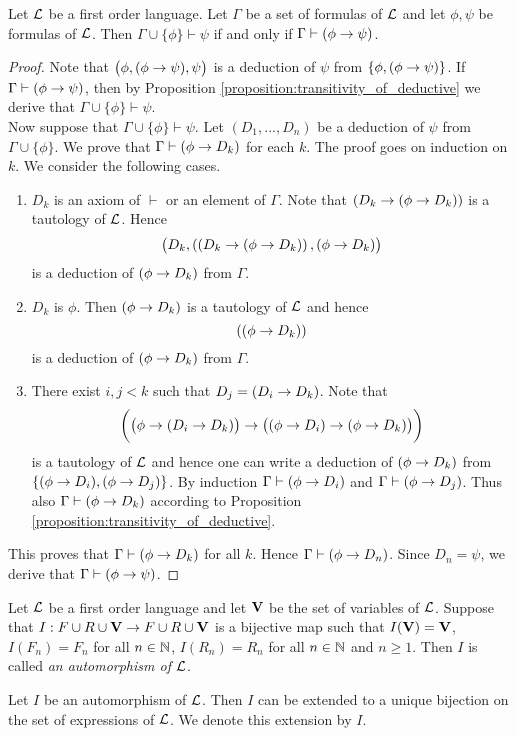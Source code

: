 \begin{theorem}\label{theorem:deduction_theorem}
Let ${\mathcal L}$ be a first order language. Let $\Gamma$ be a set of formulas of ${\mathcal L}$ and let $\phi, \psi$ be formulas of ${\mathcal L}$. Then $\Gamma \cup \{\phi\} \vdash \psi$ if and only if $\Gamma \vdash (\phi \rightarrow \psi)$.
\end{theorem}
\begin{proof}
Note that $\big(\phi, (\phi \rightarrow \psi) , \psi\big)$ is a deduction of $\psi$ from $\{\phi, (\phi \rightarrow \psi)\}$. If $\Gamma \vdash (\phi \rightarrow \psi)$, then by Proposition \ref{proposition:transitivity_of_deductive} we derive that $\Gamma \cup \{\phi\} \vdash \psi$.\\
Now suppose that $\Gamma \cup \{\phi\} \vdash \psi$. Let $(D_1 , ..., D_n)$ be a deduction of $\psi$ from $\Gamma \cup \{\phi\}$. We prove that $\Gamma \vdash (\phi \rightarrow D_k)$ for each $k$. The proof goes on induction on $k$. We consider the following cases.
\begin{enumerate}[label=\textbf{(\arabic*)}, leftmargin=3.0em]
\item $D_k$ is an axiom of $\vdash$ or an element of $\Gamma$. Note that $\left(D_k \rightarrow (\phi \rightarrow D_k )\right)$ is a tautology of ${\mathcal L}$. Hence
$$\big(D_k,\left((D_k \rightarrow (\phi \rightarrow D_k )\right),(\phi \rightarrow D_k )\big)$$
is a deduction of $(\phi \rightarrow D_k)$ from $\Gamma$.
\item $D_k$ is $\phi$. Then $(\phi \rightarrow D_k)$ is a tautology of ${\mathcal L}$ and hence
$$\left((\phi \rightarrow D_k )\right)$$
is a deduction of $(\phi \rightarrow D_k)$ from $\Gamma$.
\item There exist $i, j < k$ such that $D_j = (D_i \rightarrow D_k)$. Note that
$$\bigg(\big(\phi \rightarrow (D_i \rightarrow D_k)\big) \rightarrow \big((\phi \rightarrow D_i ) \rightarrow (\phi \rightarrow D_k)\big)\bigg)$$
is a tautology of ${\mathcal L}$ and hence one can write a deduction of $(\phi \rightarrow D_k)$ from $\{(\phi \rightarrow D_i),(\phi \rightarrow D_j)\}$. By induction $\Gamma \vdash (\phi \rightarrow D_i)$ and $\Gamma \vdash (\phi \rightarrow D_j)$. Thus also $\Gamma \vdash (\phi \rightarrow D_k)$ according to Proposition \ref{proposition:transitivity_of_deductive}.
\end{enumerate}
This proves that $\Gamma \vdash (\phi \rightarrow D_k)$ for all $k$. Hence $\Gamma \vdash (\phi \rightarrow D_n)$. Since $D_n = \psi$, we derive that $\Gamma \vdash (\phi \rightarrow \psi)$.
\end{proof}

\begin{definition}
Let ${\mathcal L}$ be a first order language and let $\mathbf{V}$ be the set of variables of ${\mathcal L}$. Suppose that $I:F\cup R \cup \mathbf{V}\rightarrow F \cup R \cup \mathbf{V}$ is a bijective map such that $I(\mathbf{V}) = \mathbf{V}$, $I(F_n) = F_n$ for all $n \in {\mathbb N}$, $I(R_n) = R_n$ for all $n \in {\mathbb N}$ and $n \geq 1$. Then $I$ is called \textit{an automorphism of ${\mathcal L}$}.
\end{definition}
\noindent
Let $I$ be an automorphism of ${\mathcal L}$. Then $I$ can be extended to a unique bijection on the set of expressions of ${\mathcal L}$. We denote this extension by $I$.

